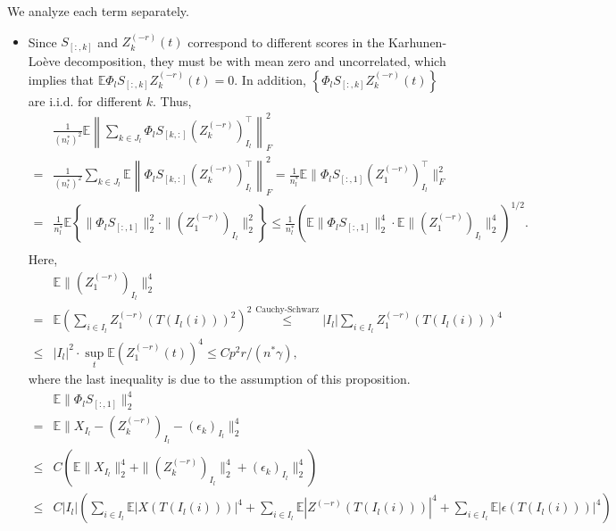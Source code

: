 \documentclass[11pt]{article}
\newcommand{\0}{{\mathbf{0}}}
\newcommand{\1}{{\mathbf{1}}}
\begin{document}
\begin{enumerate}[leftmargin=*]
\begin{equation*}
	\end{equation*}
	We analyze each term separately.
	\begin{itemize}[leftmargin=*]
		\item 
		Since $S_{[:, k]}$ and $Z_k^{(-r)}(t)$ correspond to different scores in the Karhunen-Lo\`eve decomposition, they must be with mean zero and  uncorrelated, which implies that $\mathbb{E} \Phi_l S_{[:, k]} Z^{(-r)}_k(t) = 0$. In addition, $\left\{\Phi_l S_{[:, k]}Z_k^{(-r)}(t)\right\}$ are i.i.d. for different $k$. Thus,
		\begin{equation*}
		\begin{split}
		& \frac{1}{(n_l^\ast)^2}\mathbb{E}\left\|\sum_{k \in J_l} \Phi_l S_{[k, :]}(Z_k^{(-r)})_{I_l}^\top\right\|_F^2\\
		= & \frac{1}{(n_l^\ast)^2}\sum_{k \in J_l}\mathbb{E} \left\|\Phi_l S_{[k, :]} (Z_k^{(-r)})_{I_l}^\top\right\|_F^2 =  \frac{1}{n_l^\ast} \mathbb{E} \|\Phi_l S_{[:, 1]}(Z_1^{(-r)})_{I_l}^\top\|_F^2 \\
		= & \frac{1}{n_l^\ast} \mathbb{E}\left\{\|\Phi_l S_{[:, 1]}\|_2^2 \cdot\|(Z^{(-r)}_1)_{I_l}\|_2^2\right\} \leq \frac{1}{n_l^\ast} \left(\mathbb{E}\|\Phi_l S_{[:, 1]}\|_2^4 \cdot \mathbb{E} \|(Z_1^{(-r)})_{I_l}\|_2^4\right)^{1/2}.\\
		\end{split}
		\end{equation*}
		Here,
		\begin{equation*}
		\begin{split}
		& \mathbb{E}\|(Z_1^{(-r)})_{I_l}\|_2^4 \\
		= & \mathbb{E}\left(\sum_{i \in I_l} Z_1^{(-r)}(T(I_l(i)))^2 \right)^2 \overset{\text{Cauchy-Schwarz}}{\leq} |I_l| \sum_{i\in I_l} Z_1^{(-r)}(T(I_l(i)))^4 \\
		\leq & |I_l|^2 \cdot \sup_t \mathbb{E}(Z_1^{(-r)}(t))^4  \leq Cp^2r/(n^\ast \gamma),
		\end{split}
		\end{equation*}
		where the last inequality is due to the assumption of this proposition.
		\begin{equation*}
		\begin{split}
		& \mathbb{E} \|\Phi_l S_{[:, 1]}\|_2^4 \\
		= & \mathbb{E} \|X_{I_l} - (Z^{(-r)}_k)_{I_l} - (\epsilon_k)_{I_l}\|_2^4\\
		\leq & C\left(\mathbb{E} \|X_{I_l}\|_2^4 + \|(Z^{(-r)}_k)_{I_l}\|_2^4 + (\epsilon_k)_{I_l}\|_2^4\right)\\
		\leq & C|I_l|\left(\sum_{i \in I_l}\mathbb{E}|X(T(I_l(i)))|^4 + \sum_{i \in I_l}\mathbb{E}|Z^{(-r)}(T(I_l(i)))|^4 + \sum_{i \in I_l}\mathbb{E}|\epsilon(T(I_l(i)))|^4\right)\\

\end{split}
\end{equation*}
\end{itemize}
\end{enumerate}
\end{document}
